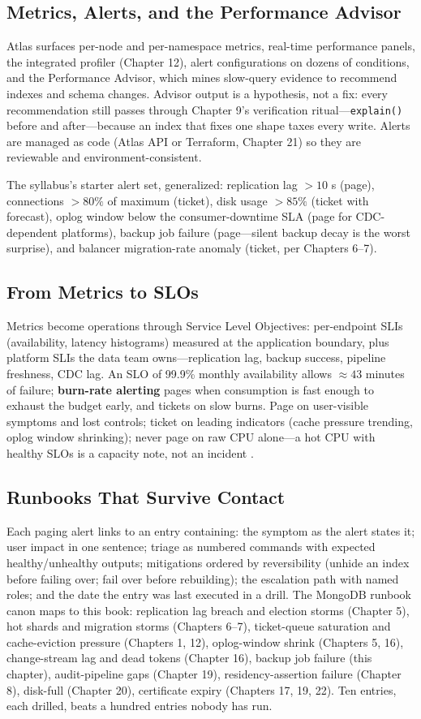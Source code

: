 \subsection{Metrics, Alerts, and the Performance Advisor}
Atlas surfaces per-node and per-namespace metrics, real-time performance panels, the integrated profiler (Chapter 12), alert configurations on dozens of conditions, and the Performance Advisor, which mines slow-query evidence to recommend indexes and schema changes. Advisor output is a hypothesis, not a fix: every recommendation still passes through Chapter 9's verification ritual---\texttt{explain()} before and after---because an index that fixes one shape taxes every write. Alerts are managed as code (Atlas API or Terraform, Chapter 21) so they are reviewable and environment-consistent.

The syllabus's starter alert set, generalized: replication lag $>10$ s (page), connections $>80\%$ of maximum (ticket), disk usage $>85\%$ (ticket with forecast), oplog window below the consumer-downtime SLA (page for CDC-dependent platforms), backup job failure (page---silent backup decay is the worst surprise), and balancer migration-rate anomaly (ticket, per Chapters 6--7).

\subsection{From Metrics to SLOs}
Metrics become operations through Service Level Objectives: per-endpoint SLIs (availability, latency histograms) measured at the application boundary, plus platform SLIs the data team owns---replication lag, backup success, pipeline freshness, CDC lag. An SLO of 99.9\% monthly availability allows ${\approx}43$ minutes of failure; \textbf{burn-rate alerting} pages when consumption is fast enough to exhaust the budget early, and tickets on slow burns. Page on user-visible symptoms and lost controls; ticket on leading indicators (cache pressure trending, oplog window shrinking); never page on raw CPU alone---a hot CPU with healthy SLOs is a capacity note, not an incident \cite{sreBook}.

\subsection{Runbooks That Survive Contact}
Each paging alert links to an entry containing: the symptom as the alert states it; user impact in one sentence; triage as numbered commands with expected healthy/unhealthy outputs; mitigations ordered by reversibility (unhide an index before failing over; fail over before rebuilding); the escalation path with named roles; and the date the entry was last executed in a drill. The MongoDB runbook canon maps to this book: replication lag breach and election storms (Chapter 5), hot shards and migration storms (Chapters 6--7), ticket-queue saturation and cache-eviction pressure (Chapters 1, 12), oplog-window shrink (Chapters 5, 16), change-stream lag and dead tokens (Chapter 16), backup job failure (this chapter), audit-pipeline gaps (Chapter 19), residency-assertion failure (Chapter 8), disk-full (Chapter 20), certificate expiry (Chapters 17, 19, 22). Ten entries, each drilled, beats a hundred entries nobody has run.

